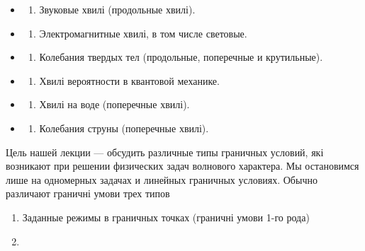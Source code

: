\documentclass[
  ukrainian,
]{article}
\providecommand{\tightlist}{%
  \setlength{\itemsep}{0pt}\setlength{\parskip}{0pt}}
\begin{document}
\begin{itemize}
\tightlist
\item
  \begin{enumerate}
  \def\labelenumi{\arabic{enumi}.}
  \tightlist
  \item
    Звуковые хвилі (продольные хвилі).
  \end{enumerate}
\item
  \begin{enumerate}
  \def\labelenumi{\arabic{enumi}.}
  \setcounter{enumi}{1}
  \tightlist
  \item
    Электромагнитные хвилі, в том числе световые.
  \end{enumerate}
\item
  \begin{enumerate}
  \def\labelenumi{\arabic{enumi}.}
  \setcounter{enumi}{2}
  \tightlist
  \item
    Колебания твердых тел (продольные, поперечные и крутильные).
  \end{enumerate}
\item
  \begin{enumerate}
  \def\labelenumi{\arabic{enumi}.}
  \setcounter{enumi}{3}
  \tightlist
  \item
    Хвилі вероятности в квантовой механике.
  \end{enumerate}
\item
  \begin{enumerate}
  \def\labelenumi{\arabic{enumi}.}
  \setcounter{enumi}{4}
  \tightlist
  \item
    Хвилі на воде (поперечные хвилі).
  \end{enumerate}
\item
  \begin{enumerate}
  \def\labelenumi{\arabic{enumi}.}
  \setcounter{enumi}{5}
  \tightlist
  \item
    Колебания струны (поперечные хвилі).
  \end{enumerate}
\end{itemize}

Цель нашей лекции --- обсудить различные типы граничных условий, які
возникают при решении физических задач волнового характера. Мы
остановимся лише на одномерных задачах и линейных граничных условиях.
Обычно различают граничні умови трех типов

\begin{enumerate}
\def\labelenumi{\arabic{enumi}.}
\item
  Заданные режимы в граничных точках (граничні умови 1-го рода)
\item
\end{enumerate}
\end{document}
